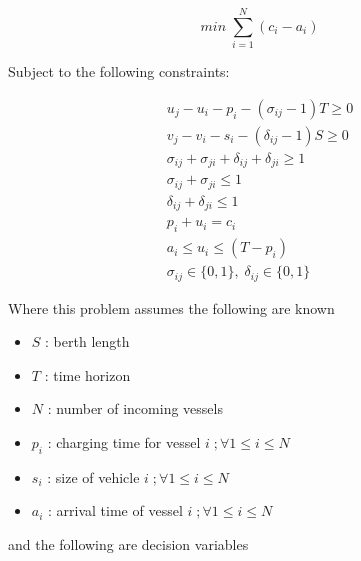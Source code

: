 \documentclass[letterpaper, 10pt, conference]{IEEEtran}
\begin{document}
\begin{equation}
	\label{eq:bapobjective}
	min\; \sum_{i=1}^N (c_i - a_i)
\end{equation}

Subject to the following constraints:

\begin{subequations}
\label{eq:bapconstrs}
\begin{align}
    u_j - u_i - p_i - (\sigma_{ij} - 1)T \geq 0                     \label{subeq:baptime}         \\
    v_j - v_i - s_i - (\delta_{ij} - 1)S \geq 0                     \label{subeq:bapspace}        \\
    \sigma_{ij} + \sigma_{ji} + \delta_{ij} + \delta_{ji} \geq 1    \label{subeq:bapvalid_pos}    \\
    \sigma_{ij} + \sigma_{ji} \leq 1                                \label{subeq:bapsigma}        \\
    \delta_{ij} + \delta_{ji} \leq 1                                \label{subeq:bapdelta}        \\
    p_i + u_i = c_i                                                 \label{subeq:bapdetach}       \\
    a_i \leq u_i \leq (T - p_i)                                     \label{subeq:bapvalid_starts} \\
    \sigma_{ij} \in \{0,1\},\;\delta_{ij} \in \{0,1\}               \label{subeq:sdspace}
\end{align}
\end{subequations}

Where this problem assumes the following are known

\begin{itemize}
	\item \(S\)   : berth length
	\item \(T\)   : time horizon
	\item \(N\)   : number of incoming vessels
	\item \(p_i\) : charging time for vessel \(i\;; \forall 1 \leq i \leq N\)
	\item \(s_i\) : size of vehicle \(i\;; \forall 1 \leq i \leq N\)
	\item \(a_i\) : arrival time of vessel \(i\;; \forall 1 \leq i \leq N\)
\end{itemize}

and the following are decision variables
\end{document}
